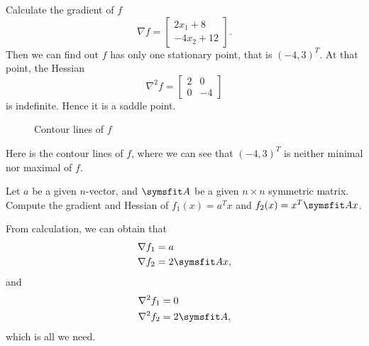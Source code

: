 \documentclass[lineno]{assignment}
\theoremstyle{plain}
\begin{document}
    \begin{solution}
        Calculate the gradient of $f$
        \begin{equation}
            \nabla f =
            \begin{bmatrix}
                2x_1+8\\
                -4x_2+12
            \end{bmatrix}.
        \end{equation}
        Then we can find out $f$ has only one stationary point, that is $(-4, 3)^T$. At that point, the Hessian
        \begin{equation}
            \nabla^{2}f =
            \begin{bmatrix}
                2 & 0\\
                0 & -4
            \end{bmatrix}
        \end{equation}
        is indefinite. Hence it is a saddle point.
        \begin{figure}[H]
            \centering
            
            \caption{Contour lines of $f$}
        \end{figure}
        Here is the contour lines of $f$, where we can see that $(-4, 3)^T$ is neither minimal nor maximal of $f$.
    \end{solution}
    \begin{problem}
        Let $a$ be a given $n$-vector, and $\matr{A}$ be a given $n\times n$ symmetric matrix. Compute the gradient and Hessian of $f_1(x)=a^Tx$ and $f_2(x)=x^T\matr{A}x$.
    \end{problem}
    \begin{solution}
        From calculation, we can obtain that
        \begin{equation}
            \begin{aligned}
                \nabla f_1 &= a\\
                \nabla f_2 &= 2\matr{A}x,
            \end{aligned}
        \end{equation}
        and
        \begin{equation}
            \begin{aligned}
                \nabla^2 f_1 &= 0\\
                \nabla^2 f_2 &= 2\matr{A},
            \end{aligned}
        \end{equation}
        which is all we need.
    \end{solution}
\end{document}
